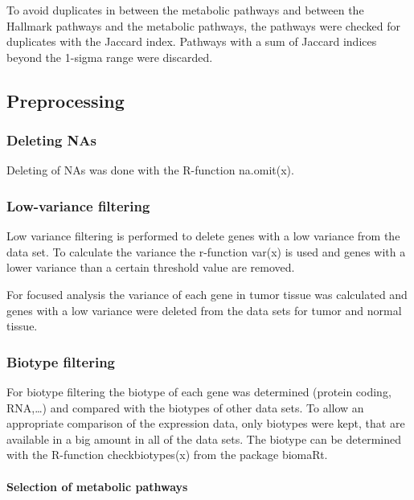\documentclass[
]{article}
\begin{document}
To avoid duplicates in between the metabolic pathways and between the
Hallmark pathways and the metabolic pathways, the pathways were checked
for duplicates with the Jaccard index. Pathways with a sum of Jaccard
indices beyond the 1-sigma range were discarded.

\hypertarget{preprocessing}{%
\subsection{Preprocessing}\label{preprocessing}}

\hypertarget{deleting-nas}{%
\subsubsection{Deleting NAs}\label{deleting-nas}}

Deleting of NAs was done with the R-function na.omit(x).

\hypertarget{low-variance-filtering}{%
\subsubsection{Low-variance filtering}\label{low-variance-filtering}}

Low variance filtering is performed to delete genes with a low variance
from the data set. To calculate the variance the r-function var(x) is
used and genes with a lower variance than a certain threshold value are
removed.

For focused analysis the variance of each gene in tumor tissue was
calculated and genes with a low variance were deleted from the data sets
for tumor and normal tissue.

\hypertarget{biotype-filtering}{%
\subsubsection{Biotype filtering}\label{biotype-filtering}}

For biotype filtering the biotype of each gene was determined (protein
coding, RNA,\ldots) and compared with the biotypes of other data sets.
To allow an appropriate comparison of the expression data, only biotypes
were kept, that are available in a big amount in all of the data sets.
The biotype can be determined with the R-function checkbiotypes(x) from
the package biomaRt.

\hypertarget{selection-of-metabolic-pathways}{%
\paragraph{Selection of metabolic
pathways}\label{selection-of-metabolic-pathways}}
\end{document}
